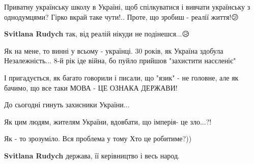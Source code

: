\begin{itemize}
\begin{itemize}
 
Приватну українську школу в Україні, щоб спілкуватися і вивчати українську з однодумцями? Гірко вкрай таке чути!.. Проте, що зробиш - реалії життя!😕

 
\textbf{Svitlana Rudych} так, від реалій нікуди не подінешся...😥

 
Як на мене, то винні у всьому - українці. 30 років, як Україна здобула
Незалежність... 8-й рік іде війна, бо пуйло прийшов "захистити насєленіє"🥶🥶🥶

І пригадується, як багато говорили і писали, що "язик" - не головне, але як
бачимо, що все таки МОВА - ЦЕ ОЗНАКА ДЕРЖАВИ!

До сьогодні гинуть захисники України...

Як цим людям, жителям України, вдовбати, що імперія- це зло...?!


 
Як - то зрозуміло. Вся проблема у тому Хто це робитиме?))

 
\textbf{Svitlana Rudych} держава, її керівництво і весь народ.


\end{itemize}
\end{itemize}
